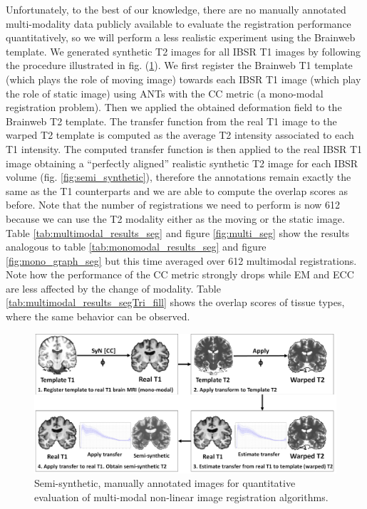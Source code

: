 Unfortunately, to the best of our knowledge, there are no manually annotated multi-modality data publicly available to evaluate the registration performance quantitatively,
so we will perform a less realistic experiment using the Brainweb template. We generated synthetic T2 images for all IBSR T1 images by following the procedure illustrated in fig. (\ref{fig:semi_synthetic_image_creation}). We first register the Brainweb T1 template (which plays the role of moving image) towards each IBSR T1 image (which play the role of static image) using ANTs with the CC metric (a mono-modal registration problem). Then we applied the obtained deformation field to the Brainweb T2 template. The transfer function from the real T1 image to the warped T2 template is computed as the average T2 intensity associated to each T1 intensity. The computed transfer function is then applied to the real IBSR T1 image obtaining a ``perfectly aligned'' realistic synthetic T2 image for each IBSR volume (fig. \ref{fig:semi_synthetic}), therefore the annotations remain exactly the same as the T1 counterparts and we are able to compute the overlap scores as before. Note that the number
of registrations we need to perform is now 612 because we can use the T2 modality either as the moving or the static image. Table \ref{tab:multimodal_results_seg} and
figure \ref{fig:multi_seg} show the results analogous to table \ref{tab:monomodal_results_seg} and figure \ref{fig:mono_graph_seg} but this time averaged over 612
multimodal registrations. Note how the performance of the CC metric strongly drops while EM and ECC are less affected by the change of modality. Table
\ref{tab:multimodal_results_segTri_fill} shows the overlap scores of tissue types, where the same behavior can be observed.\\

\begin{figure}[H]
\centering
    \includegraphics[width=\linewidth]{./images/semi_synthetic_image_creation.png}
    \caption{Semi-synthetic, manually annotated images for quantitative evaluation of multi-modal non-linear image registration algorithms.}
\label{fig:semi_synthetic_image_creation}
\end{figure}

